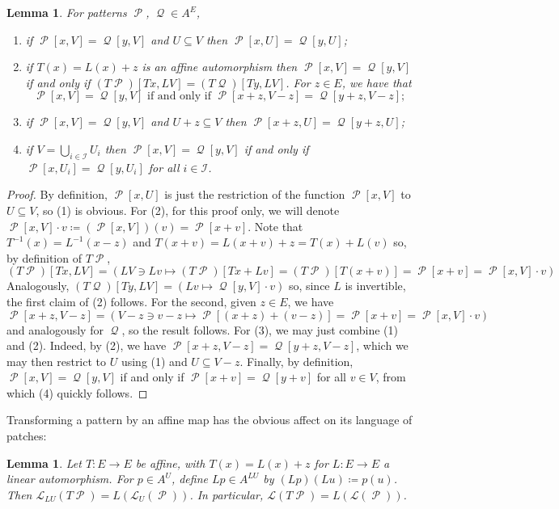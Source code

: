 \documentclass[11pt]{amsart}
\numberwithin{equation}{section}
\theoremstyle{plain}
\newtheorem{lemma}[theorem]{Lemma}
\theoremstyle{definition}
\DeclareMathOperator{\cP}{\mathcal{P}}
\DeclareMathOperator{\cQ}{\mathcal{Q}}
\newcommand{\lang}{\mathscr{L}}
\begin{document}
\begin{lemma}\label{lem:pattern properties}
For patterns \(\cP\), \(\cQ \in A^E\),
\begin{enumerate}
	\item if \(\cP[x,V] = \cQ[y,V]\) and \(U \subseteq V\) then \(\cP[x,U] = \cQ[y,U]\);
	\item if \(T(x) = L(x) + z\) is an affine automorphism then \(\cP[x,V] = \cQ[y,V]\) if and only if \((T\cP)[Tx,LV] = (T\cQ)[Ty,LV]\). For \(z \in E\), we have that
	\[
	\cP[x,V] = \cQ[y,V] \text{ if and only if } \cP[x+z,V-z] = \cQ[y+z,V-z];
	\]
	\item if \(\cP[x,V] = \cQ[y,V]\) and \(U+z \subseteq V\) then \(\cP[x+z,U] = \cQ[y+z,U]\);
	\item if \(V = \bigcup_{i \in \mathcal{I}} U_i\) then \(\cP[x,V] = \cQ[y,V]\) if and only if \(\cP[x,U_i] = \cQ[y,U_i]\) for all \(i \in \mathcal{I}\).
\end{enumerate}
\end{lemma}

\begin{proof}
By definition, \(\cP[x,U]\) is just the restriction of the function \(\cP[x,V]\) to \(U \subseteq V\), so (1) is obvious. For (2), for this proof only, we will denote \(\cP[x,V] \cdot v \coloneqq (\cP[x,V])(v) = \cP[x+v]\). Note that \(T^{-1}(x) = L^{-1}(x-z)\) and \(T(x+v) = L(x+v)+z = T(x) + L(v)\) so, by definition of \(T\cP\),
\[
(T\cP)[Tx,LV] =
\left(
LV \ni Lv \mapsto (T\cP)[Tx+Lv] = (T\cP)[T(x+v)] = \cP[x+v] = \cP[x,V] \cdot v
\right)
\]
Analogously, \((T\cQ)[Ty,LV] = (Lv \mapsto \cQ[y,V] \cdot v)\) so, since \(L\) is invertible, the first claim of (2) follows. For the second, given \(z \in E\), we have
\[
\cP[x+z,V-z] =
\left(
V-z \ni v-z \mapsto \cP[(x+z) + (v-z)] = \cP[x+v] = \cP[x,V] \cdot v
\right)
\]
and analogously for \(\cQ\), so the result follows. For (3), we may just combine (1) and (2). Indeed, by (2), we have \(\cP[x+z,V-z] = \cQ[y+z,V-z]\), which we may then restrict to \(U\) using (1) and \(U \subseteq V-z\). Finally, by definition, \(\cP[x,V] = \cQ[y,V]\) if and only if \(\cP[x+v] = \cQ[y+v]\) for all \(v \in V\), from which (4) quickly follows.
\end{proof}

Transforming a pattern by an affine map has the obvious affect on its language of patches:

\begin{lemma}\label{lem:distortions of languages}
Let \(T \colon E \to E\) be affine, with \(T(x) = L(x) + z\) for \(L \colon E \to E\) a linear automorphism. For \(p \in A^U\), define \(Lp \in A^{LU}\) by \((Lp)(Lu) \coloneqq p(u)\). Then \(\lang_{LU}(T \cP) = L(\lang_U(\cP))\). In particular, \(\lang(T\cP) = L(\lang(\cP))\).
\end{lemma}
\end{document}
